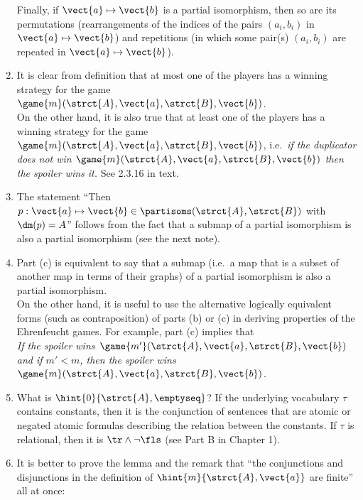 \begin{enumerate}[1.]
Finally, if $\vect{a} \mapsto \vect{b}$ is a partial isomorphism, then so are its permutations (rearrangements of the indices of the pairs $(a_i, b_i)$ in $\vect{a} \mapsto \vect{b}$) and repetitions (in which some pair(s) $(a_i, b_i)$ are repeated in $\vect{a} \mapsto \vect{b}$).
%
\item {} It is clear from definition that at most one of the players has a winning strategy for the game $\game{m}(\strct{A}, \vect{a}, \strct{B}, \vect{b})$.
\medskip\\
On the other hand, it is also true that at least one of the players has a winning strategy for the game $\game{m}(\strct{A}, \vect{a}, \strct{B}, \vect{b})$, i.e.\ \emph{if the duplicator does not win $\game{m}(\strct{A}, \vect{a}, \strct{B}, \vect{b})$ then the spoiler wins it.} See 2.3.16 in text.
%
\item {} The statement ``Then $p : \vect{a} \mapsto \vect{b} \in \partisoms(\strct{A}, \strct{B})$ with $\dm(p) = A$'' follows from the fact that a submap of a partial isomorphism is also a partial isomorphism (see the next note).
%
\item {} Part (c) is equivalent to say that a submap (i.e.\ a map that is a subset of another map in terms of their graphs) of a partial isomorphism is also a partial isomorphism.
\medskip\\
On the other hand, it is useful to use the alternative logically equivalent forms (such as contraposition) of parts (b) or (c) in deriving properties of the Ehrenfeucht games. For example, part (c) implies that
\medskip\\
\emph{If the spoiler wins $\game{m'}(\strct{A}, \vect{a}, \strct{B}, \vect{b})$ and if $m' < m$, then the spoiler wins $\game{m}(\strct{A}, \vect{a}, \strct{B}, \vect{b})$.}
%
\item {} What is $\hint{0}{\strct{A}, \emptyseq}$? If the underlying vocabulary $\tau$ contains constants, then it is the conjunction of sentences that are atomic or negated atomic formulas describing the relation between the constants. If $\tau$ is relational, then it is $\tr \land \neg\fls$ (see Part B in Chapter 1).
%
\item {} It is better to prove the lemma and the remark that ``the conjunctions and disjunctions in the definition of $\hint{m}{\strct{A}, \vect{a}}$ are finite'' all at once:
\medskip\\

\end{enumerate}
